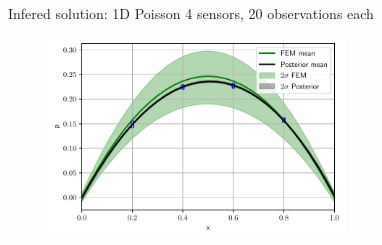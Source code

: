 \documentclass[fleqn,11pt,aspectratio=43]{beamer}
\begin{document}
\begin{frame}{Infered solution: 1D Poisson}
4 sensors, 20 observations each
      	\begin{figure}[h]
		\begin{center}
		\includegraphics[width=0.7\textwidth]{1DPost_4P20O}
		\end{center}
		\end{figure}

	\end{frame}

%
%	
%
%
	
\end{document}

